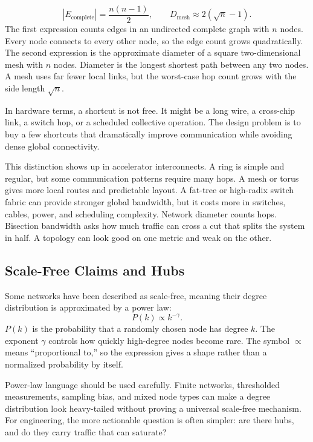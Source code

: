 \begin{keyequation}
\[
  |E_{\text{complete}}| = \frac{n(n-1)}{2},
  \qquad
  D_{\text{mesh}} \approx 2(\sqrt{n}-1).
\]
\tcblower
The first expression counts edges in an undirected complete graph with \(n\) nodes. Every node connects to every other node, so the edge count grows quadratically. The second expression is the approximate diameter of a square two-dimensional mesh with \(n\) nodes. Diameter is the longest shortest path between any two nodes. A mesh uses far fewer local links, but the worst-case hop count grows with the side length \(\sqrt{n}\).
\end{keyequation}

In hardware terms, a shortcut is not free. It might be a long wire, a cross-chip link, a switch hop, or a scheduled collective operation. The design problem is to buy a few shortcuts that dramatically improve communication while avoiding dense global connectivity.

This distinction shows up in accelerator interconnects. A ring is simple and regular, but some communication patterns require many hops. A mesh or torus gives more local routes and predictable layout. A fat-tree or high-radix switch fabric can provide stronger global bandwidth, but it costs more in switches, cables, power, and scheduling complexity. Network diameter counts hops. Bisection bandwidth asks how much traffic can cross a cut that splits the system in half. A topology can look good on one metric and weak on the other.

\subsection{Scale-Free Claims and Hubs}

Some networks have been described as scale-free, meaning their degree distribution is approximated by a power law:
\[
  P(k) \propto k^{-\gamma}.
\]
\(P(k)\) is the probability that a randomly chosen node has degree \(k\). The exponent \(\gamma\) controls how quickly high-degree nodes become rare. The symbol \(\propto\) means ``proportional to,'' so the expression gives a shape rather than a normalized probability by itself.

Power-law language should be used carefully. Finite networks, thresholded measurements, sampling bias, and mixed node types can make a degree distribution look heavy-tailed without proving a universal scale-free mechanism. For engineering, the more actionable question is often simpler: are there hubs, and do they carry traffic that can saturate?

